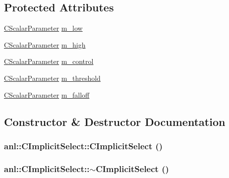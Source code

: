 \subsection*{Protected Attributes}
\begin{DoxyCompactItemize}
\item 
\hyperlink{classanl_1_1CScalarParameter}{CScalarParameter} \hyperlink{classanl_1_1CImplicitSelect_a2443fec206da41910cd53431389f61bf}{m\_\-low}
\item 
\hyperlink{classanl_1_1CScalarParameter}{CScalarParameter} \hyperlink{classanl_1_1CImplicitSelect_aaff90e0eebee8589598b8c8794b81418}{m\_\-high}
\item 
\hyperlink{classanl_1_1CScalarParameter}{CScalarParameter} \hyperlink{classanl_1_1CImplicitSelect_a801c43534fa394aaa789a46bbed182a5}{m\_\-control}
\item 
\hyperlink{classanl_1_1CScalarParameter}{CScalarParameter} \hyperlink{classanl_1_1CImplicitSelect_a21822251cc4e21a7777e221da684930d}{m\_\-threshold}
\item 
\hyperlink{classanl_1_1CScalarParameter}{CScalarParameter} \hyperlink{classanl_1_1CImplicitSelect_a38402fa60acfe5284fed5e27036e482e}{m\_\-falloff}
\end{DoxyCompactItemize}


\subsection{Constructor \& Destructor Documentation}
\hypertarget{classanl_1_1CImplicitSelect_ad88422b1f6238bf1ff219d656aebc725}{
\subsubsection[{CImplicitSelect}]{\setlength{\rightskip}{0pt plus 5cm}anl::CImplicitSelect::CImplicitSelect ()}}
\label{classanl_1_1CImplicitSelect_ad88422b1f6238bf1ff219d656aebc725}
\hypertarget{classanl_1_1CImplicitSelect_a5cea97a9db75a1794ebdb5fba8dd3423}{
\subsubsection[{$\sim$CImplicitSelect}]{\setlength{\rightskip}{0pt plus 5cm}anl::CImplicitSelect::$\sim$CImplicitSelect ()}}
\label{classanl_1_1CImplicitSelect_a5cea97a9db75a1794ebdb5fba8dd3423}



